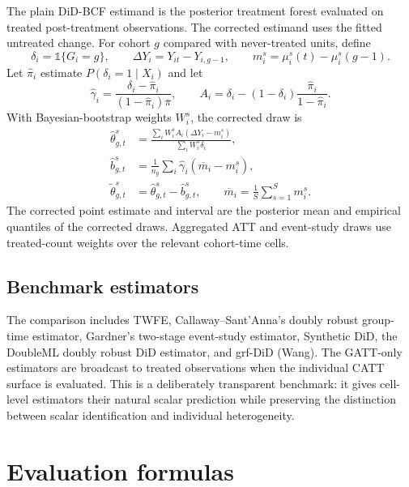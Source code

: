 \documentclass[11pt]{article}
\newcommand{\ind}{\mathbb{1}}
\begin{document}
The plain DiD-BCF estimand is the posterior treatment forest evaluated on
treated post-treatment observations. The corrected estimand uses the fitted
untreated change. For cohort $g$ compared with never-treated units, define
\begin{equation}
 \delta_i=\ind\{G_i=g\},\qquad
 \Delta Y_i=Y_{it}-Y_{i,g-1},\qquad
 m_i^s=\mu_i^s(t)-\mu_i^s(g-1).
 \label{eq:correction-inputs}
\end{equation}
Let $\widehat\pi_i$ estimate $P(\delta_i=1\mid X_i)$ and let
\begin{equation}
 \widehat\gamma_i=\frac{\delta_i-\widehat\pi_i}
 {(1-\widehat\pi_i)\overline\pi},
 \qquad
 A_i=\delta_i-(1-\delta_i)\frac{\widehat\pi_i}{1-\widehat\pi_i}.
 \label{eq:correction-weights}
\end{equation}
With Bayesian-bootstrap weights $W_i^s$, the corrected draw is
\begin{align}
 \widehat\theta_{g,t}^s
 &=\frac{\sum_iW_i^sA_i(\Delta Y_i-m_i^s)}
 {\sum_iW_i^s\delta_i},\\
 \widehat b_{g,t}^s
 &=\frac{1}{n_g}\sum_i\widehat\gamma_i(\overline m_i-m_i^s),\\
 \widetilde\theta_{g,t}^s
 &=\widehat\theta_{g,t}^s-\widehat b_{g,t}^s,
 \qquad \overline m_i=\frac{1}{S}\sum_{s=1}^S m_i^s.
 \label{eq:posterior-correction}
\end{align}
The corrected point estimate and interval are the posterior mean and empirical
quantiles of the corrected draws. Aggregated ATT and event-study draws use
treated-count weights over the relevant cohort-time cells.

\subsection{Benchmark estimators}

The comparison includes TWFE, Callaway--Sant'Anna's doubly robust group-time
estimator, Gardner's two-stage event-study estimator, Synthetic DiD, the
DoubleML doubly robust DiD estimator, and grf-DiD (Wang). The GATT-only
estimators are broadcast to treated observations when the individual CATT
surface is evaluated. This is a deliberately transparent benchmark: it gives
cell-level estimators their natural scalar prediction while preserving the
distinction between scalar identification and individual heterogeneity.

\section{Evaluation formulas}
\end{document}
